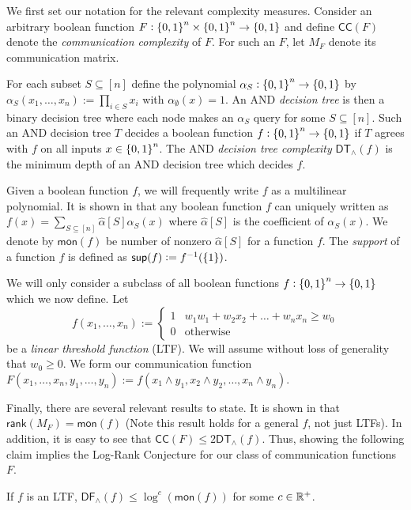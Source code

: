 We first set our notation for the relevant complexity measures. Consider an arbitrary boolean function $F : \set{0,1}^n\times\set{0,1}^n\to\set{0,1}$ and define $\mathsf{CC}(F)$ denote the \textit{communication complexity} of $F$. For such an $F$, let $M_F$ denote its communication matrix. 
    
    For each subset $S\subseteq [n]$ define the polynomial $\alpha_S : \set{0,1}^n\to \set{0,1}$ by $\alpha_S(x_1,\dots,x_n) := \prod_{i\in S} x_i$ with $\alpha_\emptyset(x) = 1$. An \textsf{AND} \textit{ decision tree} is then a binary decision tree where each node makes an $\alpha_S$ query for some $S\subseteq [n]$. Such an \textsf{AND} decision tree $T$ decides a boolean function $f : \set{0,1}^n\to\set{0,1}$ if $T$ agrees with $f$ on all inputs $x\in \set{0,1}^n$. The \textsf{AND} \textit{decision tree complexity} $\mathsf{DT}_{\wedge}(f)$ is the minimum depth of an \textsf{AND} decision tree which decides $f$. 
    
    Given a boolean function $f$, we will frequently write $f$ as a multilinear polynomial. It is shown in \cite{ODonnell2007} that any boolean function $f$ can uniquely written as $f(x) = \sum_{S\subseteq [n]} \hat{\alpha}[S]\alpha_S(x)$ where $\hat{\alpha}[S]$ is the coefficient of $\alpha_S(x)$. We denote by $\mathsf{mon}(f)$ be number of nonzero $\hat{\alpha}[S]$ for a function $f$. The \textit{support} of a function $f$ is defined as $\mathsf{sup}(f) := f^{-1}(\set{1})$.
    
	We will only consider a subclass of all boolean functions $f: \set{0,1}^n\to \set{0,1}$ which we now define. Let 
    \[
    f(x_1,\dots,x_n) := \begin{cases}
		1 & w_1w_1 + w_2x_2 + \dots + w_nx_n \geq w_0\\
        0 & \text{otherwise}
	\end{cases}
    \] be a \textit{linear threshold function} (LTF). We will assume without loss of generality that $w_0 \geq 0$. We form our communication function $F(x_1,\dots,x_n,y_1,\dots,y_n) := f(x_1\wedge y_1,x_2\wedge y_2,\dots,x_n\wedge y_n)$. 
    
    Finally, there are several relevant results to state. It is shown in \cite{Buhrman1999} that $\mathsf{rank}(M_F) = \mathsf{mon}(f)$ (Note this result holds for a general $f$, not just LTFs). In addition, it is easy to see that $\mathsf{CC}(F) \leq 2\mathsf{DT}_{\wedge}(f)$. Thus, showing the following claim implies the Log-Rank Conjecture for our class of communication functions $F$.
    \begin{proposition}\label{logRankDTC}
    	If $f$ is an LTF, $\mathsf{DF}_{\wedge}(f) \leq \log^c(\mathsf{mon}(f))$ for some $c \in \mathbb{R}^+$.
    \end{proposition}